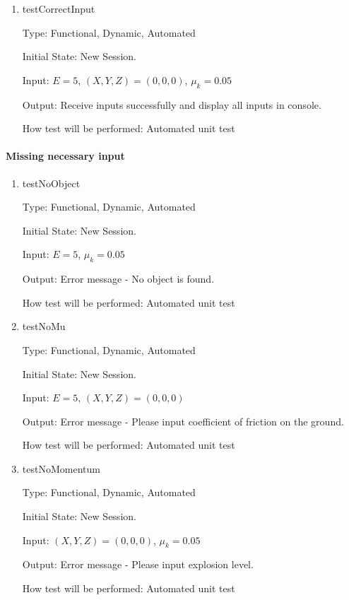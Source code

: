 \documentclass[12pt, titlepage]{article}
\begin{document}
\begin{enumerate}

\item{testCorrectInput\\}

Type: Functional, Dynamic, Automated

Initial State: New Session.

Input: $E = 5$, $(X,Y,Z) = (0,0,0)$, $\mu_{k} = 0.05$  

Output: Receive inputs successfully and display all inputs in console.

How test will be performed: Automated unit test 

\end{enumerate}

\paragraph{Missing necessary input}

\begin{enumerate}
	
\item{testNoObject\\}

Type: Functional, Dynamic, Automated
					
Initial State: New Session.
					
Input: $E = 5$, $\mu_{k} = 0.05$
					
Output: Error message - No object is found.
					
How test will be performed: Automated unit test
					
\item{testNoMu\\}

Type: Functional, Dynamic, Automated

Initial State: New Session.

Input: $E = 5$, $(X,Y,Z) = (0,0,0)$  

Output: Error message - Please input coefficient of friction on the ground.

How test will be performed: Automated unit test

\item{testNoMomentum\\}

Type: Functional, Dynamic, Automated

Initial State: New Session.

Input: $(X,Y,Z) = (0,0,0)$, $\mu_{k} = 0.05$  

Output: Error message - Please input explosion level.

How test will be performed: Automated unit test

\end{enumerate}
\end{document}
